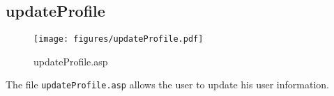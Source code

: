 \subsection{updateProfile}
\begin{figure}[htb]
    \begin{center}
        \texttt{[image: figures/updateProfile.pdf]}
    \end{center}
    \caption{updateProfile.asp}
    \label{fig:updateProfile}
\end{figure}

The file \verb|updateProfile.asp| allows the user to update his user
information.

